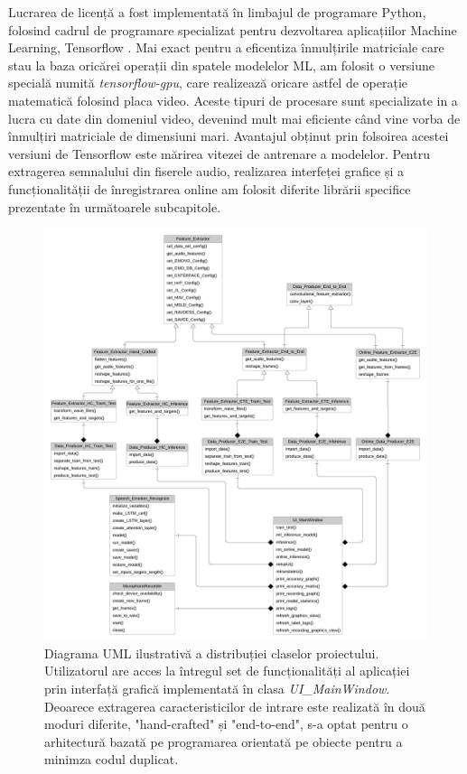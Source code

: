 \documentclass[a4paper,12pt]{book}
\begin{document}
				Lucrarea de licență a fost implementată în limbajul de programare Python, folosind cadrul de programare specializat pentru dezvoltarea aplicațiilor Machine Learning, Tensorflow \cite{tensorflow}. Mai exact pentru a eficentiza înmulțirile matriciale care stau la baza oricărei operații din spatele modelelor ML, am folosit o versiune specială numită \textit{tensorflow-gpu}, care realizează oricare astfel de operație matematică folosind placa video. Aceste tipuri de procesare sunt specializate in a lucra cu date din domeniul video, devenind mult mai eficiente când vine vorba de înmulțiri matriciale de dimensiuni mari. Avantajul obținut prin folsoirea acestei versiuni de Tensorflow este mărirea  vitezei de antrenare a modelelor. Pentru extragerea semnalului din fiserele audio, realizarea interfeței grafice și a funcționalității de înregistrarea online am folosit diferite librării specifice prezentate în următoarele subcapitole. \par
				\begin{figure}[p]
					\hspace*{-1,5cm}
					\centering
					\includegraphics[scale=0.56]{uml}
					\caption{Diagrama UML ilustrativă a distribuției claselor proiectului. Utilizatorul are acces la întregul set de funcționalități al aplicației prin interfață grafică implementată în clasa \textit{UI\_MainWindow}.  Deoarece extragerea caracteristicilor de intrare este realizată în două moduri diferite, "hand-crafted" și "end-to-end", s-a optat pentru o arhitectură bazată pe programarea orientată pe obiecte pentru a minimza codul duplicat.}
					\label{fig:uml}
				\end{figure} 
			
\end{document}
